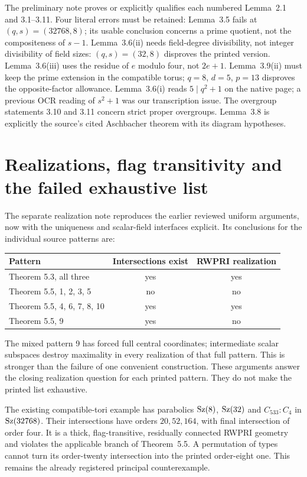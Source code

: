\documentclass[11pt,a4paper]{article}
\begin{document}
The preliminary note proves or explicitly qualifies each numbered
Lemma~2.1 and 3.1--3.11. Four literal errors must be retained:
Lemma~3.5 fails at $(q,s)=(32768,8)$; its usable conclusion concerns
a prime quotient, not the compositeness of $s-1$.
Lemma~3.6(ii) needs field-degree divisibility, not integer divisibility
of field sizes: $(q,s)=(32,8)$ disproves the printed version.
Lemma~3.6(iii) uses the residue of $e$ modulo four, not $2e+1$.
Lemma~3.9(ii) must keep the prime extension in the compatible torus;
$q=8$, $d=5$, $p=13$ disproves the opposite-factor allowance.
Lemma~3.6(i) reads $5\mid q^2+1$ on the native page; a previous OCR
reading of $s^2+1$ was our transcription issue. The overgroup statements
3.10 and 3.11 concern strict proper overgroups. Lemma~3.8 is explicitly
the source's cited Aschbacher theorem with its diagram hypotheses.

\section{Realizations, flag transitivity and the failed exhaustive list}
The separate realization note reproduces the earlier reviewed uniform
arguments, now with the uniqueness and scalar-field interfaces explicit.
Its conclusions for the individual source patterns are:
\begin{center}
\begin{tabular}{lcc}\toprule
Pattern & Intersections exist & RWPRI realization\\\midrule
Theorem 5.3, all three & yes & yes\\
Theorem 5.5, 1, 2, 3, 5 & no & no\\
Theorem 5.5, 4, 6, 7, 8, 10 & yes & yes\\
Theorem 5.5, 9 & yes & no\\\bottomrule
\end{tabular}
\end{center}
The mixed pattern 9 has forced full central coordinates; intermediate
scalar subspaces destroy maximality in every realization of that full
pattern. This is stronger than the failure of one convenient construction.
These arguments answer the closing realization question for each
printed pattern. They do not make the printed list exhaustive.

The existing compatible-tori example has parabolics
$\operatorname{Sz}(8)$, $\operatorname{Sz}(32)$ and $C_{533}:C_4$ in $\operatorname{Sz}(32768)$.
Their intersections have orders $20,52,164$, with final intersection
of order four. It is a thick, flag-transitive, residually connected
RWPRI geometry and violates the applicable branch of Theorem~5.5.
A permutation of types cannot turn its order-twenty intersection into
the printed order-eight one. This remains the already registered
principal counterexample.
\end{document}
